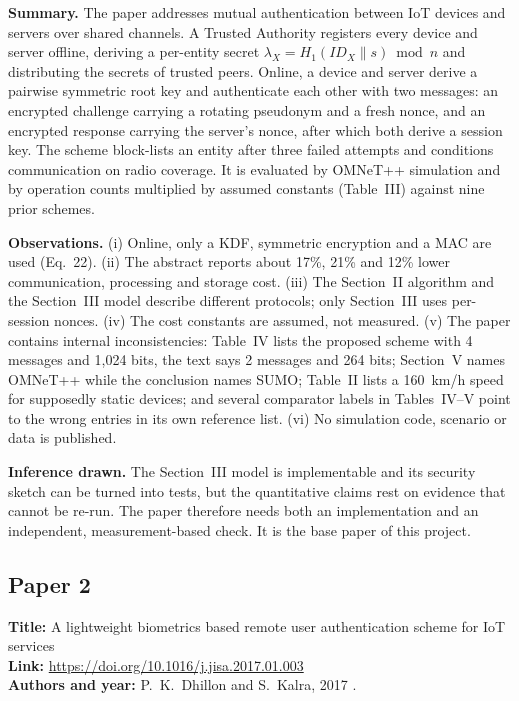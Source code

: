 \documentclass[12pt,a4paper,oneside]{report}
\numberwithin{equation}{chapter}
\begin{document}
\noindent\textbf{Summary.} The paper addresses mutual authentication between IoT devices and servers over shared channels. A Trusted Authority registers every device and server offline, deriving a per-entity secret $\lambda_X = H_1(ID_X \| s) \bmod n$ and distributing the secrets of trusted peers. Online, a device and server derive a pairwise symmetric root key and authenticate each other with two messages: an encrypted challenge carrying a rotating pseudonym and a fresh nonce, and an encrypted response carrying the server's nonce, after which both derive a session key. The scheme block-lists an entity after three failed attempts and conditions communication on radio coverage. It is evaluated by OMNeT++ simulation and by operation counts multiplied by assumed constants (Table~III) against nine prior schemes.

\noindent\textbf{Observations.} (i) Online, only a KDF, symmetric encryption and a MAC are used (Eq.~22). (ii) The abstract reports about 17\%, 21\% and 12\% lower communication, processing and storage cost. (iii) The Section~II algorithm and the Section~III model describe different protocols; only Section~III uses per-session nonces. (iv) The cost constants are assumed, not measured. (v) The paper contains internal inconsistencies: Table~IV lists the proposed scheme with 4 messages and 1{,}024 bits, the text says 2 messages and 264 bits; Section~V names OMNeT++ while the conclusion names SUMO; Table~II lists a 160~km/h speed for supposedly static devices; and several comparator labels in Tables~IV--V point to the wrong entries in its own reference list. (vi) No simulation code, scenario or data is published.

\noindent\textbf{Inference drawn.} The Section~III model is implementable and its security sketch can be turned into tests, but the quantitative claims rest on evidence that cannot be re-run. The paper therefore needs both an implementation and an independent, measurement-based check. It is the base paper of this project.

\subsection*{Paper 2}
\noindent\textbf{Title:} A lightweight biometrics based remote user authentication scheme for IoT services\\
\textbf{Link:} \url{https://doi.org/10.1016/j.jisa.2017.01.003}\\
\textbf{Authors and year:} P.~K.~Dhillon and S.~Kalra, 2017 \cite{dhillon2017lightweight}.
\end{document}
